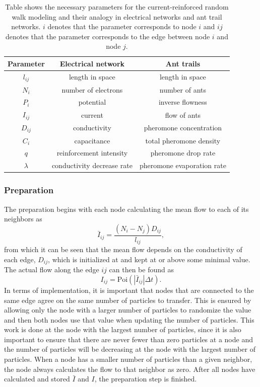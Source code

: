 \begin{table}
\centering
\caption{Table shows the necessary parameters for the current-reinforced random walk modeling and their analogy in electrical networks and ant trail networks. $i$ denotes that the parameter corresponds to node $i$ and $ij$ denotes that the parameter corresponds to the edge between node $i$ and node $j$.}
\label{tab:parameters}
\begin{tabular}{ c | c | c }                       
	\textbf{Parameter} & \textbf{Electrical network} & \textbf{Ant trails} \\
	\hline
	$l_{ij}$ & length in space & length in space \\
	\hline
	$N_{i}$ & number of electrons & number of ants \\
	\hline	
	$P_{i}$ & potential & inverse flowness \\
	\hline
	$I_{ij}$ & current & flow of ants \\
	\hline
	$D_{ij}$ & conductivity & pheromone concentration \\
	\hline
	$C_{i}$ & capacitance & total pheromone density \\
	\hline
	$q$ & reinforcement intensity & pheromone drop rate \\
	\hline
	$\lambda$ & conductivity decrease rate & pheromone evaporation rate \\
\end{tabular} 
\end{table}

\subsubsection{Preparation}
The preparation begins with each node calculating the mean flow to each of its neighbors as
\begin{equation}
\bar{I}_{ij} = \frac{(N_i - N_j)D_{ij}}{l_{ij}},
\end{equation}
from which it can be seen that the mean flow depends on the conductivity of each edge, $D_{ij}$, which is 	initialized at and kept at or above some minimal value.
The actual flow along the edge $ij$ can then be found as
\begin{equation}
I_{ij} = \text{Poi}(|\bar{I}_{ij}|\Delta t).
\end{equation}
In terms of implementation, it is important that nodes that are connected to the same edge agree on the same number of particles to transfer. This is ensured by allowing only the node with a larger number of particles to randomize the value and then both nodes use that value when updating the number of particles. This work is done at the node with the largest number of particles, since it is also important to ensure that there are never fewer than zero particles at a node and the number of particles will be decreasing at the node with the largest number of particles. When a node has a smaller number of particles than a given neighbor, the node always calculates the flow to that neighbor as zero. After all nodes have calculated and stored $\bar{I}$ and $I$, the preparation step is finished.

